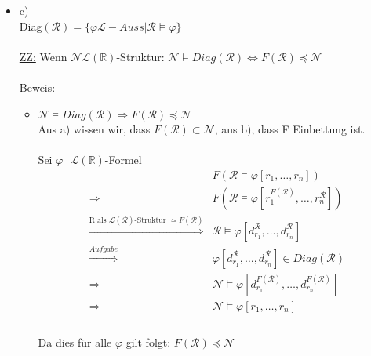 \documentclass[a4paper]{scrartcl}
\begin{document}
\begin{itemize}
        \item c)\\
            Diag$(\mathcal{R}) = \{\varphi \mathscr{L}-Auss | \mathcal{R} \vDash \varphi\}$\\
            \\\underline{ZZ:} 
            Wenn $\mathcal{N} \mathscr{L}(\mathds{R})$-Struktur: $\mathcal{N} \vDash Diag(\mathcal{R}) \Leftrightarrow F(\mathcal{R}) \preceq \mathcal{N}$\\
            \\\underline{Beweis:}\\

            \begin{itemize}
                \item $\mathcal{N} \vDash Diag(\mathcal{R}) \Rightarrow F(\mathcal{R}) \preceq \mathcal{N}$\\
                    Aus a) wissen wir, dass  $F(\mathcal{R}) \subset \mathcal{N}$, aus  b), dass F Einbettung ist.\\
                    \\Sei $\varphi \text{  } \mathscr{L}(\mathds{R})$-Formel\\
                    \begin{equation*}
                        \begin{split}
                            \label{eq:}
                            & F(\mathcal{R} \vDash \varphi[r_1,\dots,r_n])\\
                            \Rightarrow & F(\mathcal{R} \vDash \varphi[r_1^{F(\mathcal{R})},\dots,r_n^{\mathcal{R}}])\\
                            \overset{\text{R als }\mathscr{L}(\mathcal{R}) \text{-Struktur } \simeq F(\mathcal{R})}{\Rightarrow} & \mathcal{R} \vDash
                            \varphi[d_{r_1}^\mathcal{R},\dots,d_{r_n}^\mathcal{R}]\\
                            \overset{Aufgabe}{\Rightarrow} & \varphi[d_{r_1}^\mathcal{R},\dots,d_{r_n}^\mathcal{R}] \in Diag(\mathcal{R})\\
                            \Rightarrow & \mathcal{N} \vDash \varphi[d_{r_1}^{F(\mathcal{R})},\dots,d_{r_n}^{F(\mathcal{R})}]\\
                            \Rightarrow & \mathcal{N} \vDash \varphi[r_1,\dots,r_n]\\
                        \end{split}
                    \end{equation*}
                    \\Da dies für alle $\varphi$ gilt folgt: $F(\mathcal{R}) \preceq \mathcal{N}$\\
            

\end{itemize}
\end{itemize}
\end{document}
